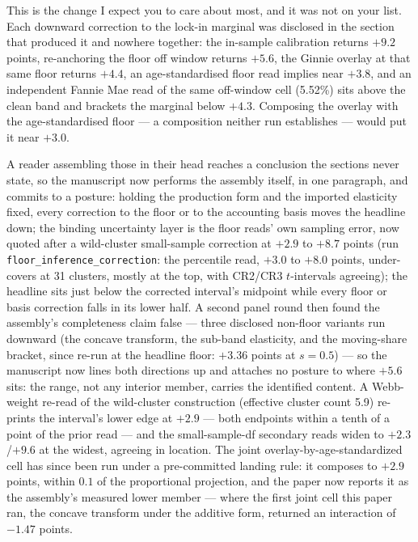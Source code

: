 \documentclass[11pt]{article}
\begin{document}
This is the change I expect you to care about most, and it was not on your list. Each
downward correction to the lock-in marginal was disclosed in the section that produced
it and nowhere together: the in-sample calibration returns $+9.2$ points, re-anchoring
the floor off window returns $+5.6$, the Ginnie overlay at that same floor returns
$+4.4$, an age-standardised floor read implies near $+3.8$, and an independent Fannie
Mae read of the same off-window cell (5.52\%) sits above the clean band and brackets
the marginal below $+4.3$. Composing the overlay with the age-standardised floor ---
a composition neither run establishes --- would put it near $+3.0$.

A reader assembling those in their head reaches a conclusion the sections never state,
so the manuscript now performs the assembly itself, in one paragraph, and commits to a
posture: holding the production form and the imported elasticity fixed, every
correction to the floor or to the accounting basis moves the headline down; the
binding uncertainty layer is the floor reads' own sampling error, now quoted after a
wild-cluster small-sample correction at $+2.9$ to $+8.7$ points (run
\texttt{floor\_inference\_correction}: the percentile read, $+3.0$ to $+8.0$ points,
under-covers at 31 clusters, mostly at the top, with CR2/CR3 $t$-intervals agreeing);
the headline sits just below the corrected interval's midpoint while every floor or
basis correction falls in its lower half. A second panel round then found the
assembly's completeness claim false --- three disclosed non-floor variants run
downward (the concave transform, the sub-band elasticity, and the moving-share
bracket, since re-run at the headline floor: $+3.36$ points at $s=0.5$) --- so the
manuscript now lines both directions up and attaches no posture to where $+5.6$
sits: the range, not any interior member, carries the identified content. A Webb-weight re-read of the wild-cluster construction (effective cluster count 5.9) re-prints the interval's lower edge at $+2.9$ --- both endpoints within a tenth of a point of the prior read --- and the small-sample-df secondary reads widen to $+2.3$/$+9.6$ at the widest, agreeing in location. The joint overlay-by-age-standardized
cell has since been run under a pre-committed landing rule: it composes to $+2.9$
points, within $0.1$ of the proportional projection, and the paper now reports it
as the assembly's measured lower member --- where the first joint cell this paper
ran, the concave transform under the additive form, returned an interaction of
$-1.47$ points.
\end{document}
